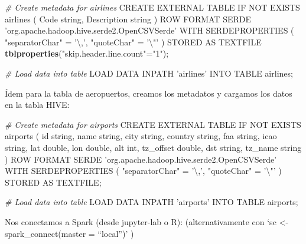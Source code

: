 \documentclass[]{book}
\newenvironment{Shaded}{\begin{snugshade}}{\end{snugshade}}
\newcommand{\CharTok}[1]{\textcolor[rgb]{0.31,0.60,0.02}{#1}}
\newcommand{\CommentTok}[1]{\textcolor[rgb]{0.56,0.35,0.01}{\textit{#1}}}
\newcommand{\KeywordTok}[1]{\textcolor[rgb]{0.13,0.29,0.53}{\textbf{#1}}}
\newcommand{\NormalTok}[1]{#1}
\newcommand{\StringTok}[1]{\textcolor[rgb]{0.31,0.60,0.02}{#1}}
\begin{document}
\begin{Shaded}
\begin{Highlighting}[]
\CommentTok{# Create metadata for airlines}
\NormalTok{CREATE EXTERNAL TABLE IF NOT EXISTS airlines}
\NormalTok{(}
\NormalTok{Code string,}
\NormalTok{Description string}
\NormalTok{)}
\NormalTok{ROW FORMAT SERDE }\StringTok{'org.apache.hadoop.hive.serde2.OpenCSVSerde'}
\NormalTok{WITH SERDEPROPERTIES}
\NormalTok{(}
\StringTok{"separatorChar"}\NormalTok{ =}\StringTok{ '\textbackslash{},'}\NormalTok{,}
\StringTok{"quoteChar"}\NormalTok{     =}\StringTok{ '}\CharTok{\textbackslash{}"}\StringTok{'}
\NormalTok{)}
\NormalTok{STORED AS TEXTFILE}
\KeywordTok{tblproperties}\NormalTok{(}\StringTok{"skip.header.line.count"}\NormalTok{=}\StringTok{"1"}\NormalTok{);}

\CommentTok{# Load data into table}
\NormalTok{LOAD DATA INPATH }\StringTok{'airlines'}\NormalTok{ INTO TABLE airlines;}
\end{Highlighting}
\end{Shaded}

Ídem para la tabla de aeropuertos, creamos los metadatos y cargamos los datos en la tabla HIVE:

\begin{Shaded}
\begin{Highlighting}[]
\CommentTok{# Create metadata for airports}
\NormalTok{CREATE EXTERNAL TABLE IF NOT EXISTS airports}
\NormalTok{(}
\NormalTok{id string,}
\NormalTok{name string,}
\NormalTok{city string,}
\NormalTok{country string,}
\NormalTok{faa string,}
\NormalTok{icao string,}
\NormalTok{lat double,}
\NormalTok{lon double,}
\NormalTok{alt int,}
\NormalTok{tz_offset double,}
\NormalTok{dst string,}
\NormalTok{tz_name string}
\NormalTok{)}
\NormalTok{ROW FORMAT SERDE }\StringTok{'org.apache.hadoop.hive.serde2.OpenCSVSerde'}
\NormalTok{WITH SERDEPROPERTIES}
\NormalTok{(}
\StringTok{"separatorChar"}\NormalTok{ =}\StringTok{ '\textbackslash{},'}\NormalTok{,}
\StringTok{"quoteChar"}\NormalTok{     =}\StringTok{ '}\CharTok{\textbackslash{}"}\StringTok{'}
\NormalTok{)}
\NormalTok{STORED AS TEXTFILE;}

\CommentTok{# Load data into table}
\NormalTok{LOAD DATA INPATH }\StringTok{'airports'}\NormalTok{ INTO TABLE airports;}
\end{Highlighting}
\end{Shaded}

Nos conectamos a Spark (desde jupyter-lab o R): (alternativamente con `sc \textless{}- spark\_connect(master = ``local'')' )
\end{document}
